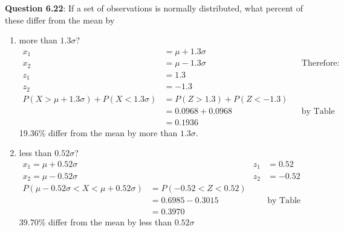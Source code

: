 \documentclass{article}
\begin{document}
    \noindent\textbf{Question 6.22}: If a set of observations is normally distributed,
    what percent of these differ from the mean by
        \begin{enumerate}[label = (\alph*) ]
            \item more than $1.3\sigma$?
                \begin{align*}
                    x_1 &= \mu + 1.3\sigma\\
                    x_2 &= \mu - 1.3\sigma &&\text{Therefore:}\\
                    z_1 &= 1.3\\
                    z_2 &= -1.3\\
                    P(X>\mu + 1.3\sigma)+P(X < 1.3\sigma) &= P(Z>1.3) + P(Z<-1.3)\\
                                                          &= 0.0968 + 0.0968 &&\text{by Table A.3}\\
                                                          &= 0.1936
                \end{align*}
                19.36\% differ from the mean by more than $1.3\sigma$.
            \item less than $0.52\sigma$?
                \begin{align*}
                    x_1 = \mu+0.52\sigma && z_1 &= 0.52\\
                    x_2 = \mu-0.52\sigma && z_2 &= -0.52\\
                    P(\mu - 0.52\sigma < X < \mu + 0.52\sigma) &= P(-0.52 < Z < 0.52) \\
                                                               &= 0.6985 - 0.3015 &&\text{by Table A.3}\\
                                                               &= 0.3970
                \end{align*}
                39.70\% differ from the mean by less than $0.52\sigma$
        \end{enumerate}
\end{document}
